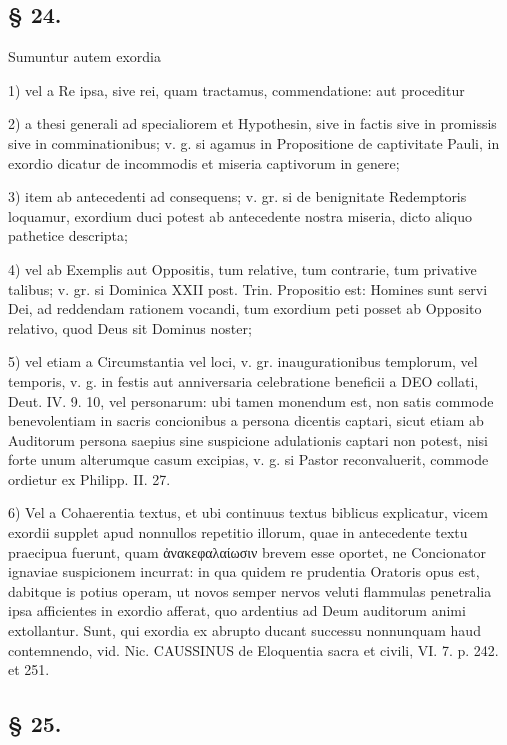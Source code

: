 \subsection*{§ 24.}

Sumuntur autem exordia

1) vel a Re ipsa, sive rei, quam tractamus, commendatione: aut proceditur

2) a thesi generali ad specialiorem et Hypothesin, sive in factis sive in promissis sive in comminationibus; v. g. si agamus in Propositione de captivitate Pauli, in exordio dicatur de incommodis et miseria captivorum in genere;

3) item ab antecedenti ad consequens; v. gr. si de benignitate Redemptoris loquamur, exordium duci potest ab antecedente nostra miseria, dicto aliquo pathetice descripta;

4) vel ab Exemplis aut Oppositis, tum relative, tum contrarie, tum privative talibus; v. gr. si Dominica XXII post. Trin. Propositio est: Homines sunt servi Dei, ad reddendam rationem vocandi, tum exordium peti posset ab Opposito relativo, quod Deus sit Dominus noster;

5) vel etiam a Circumstantia vel loci, v. gr. inaugurationibus templorum, vel temporis, v. g. in festis aut anniversaria celebratione beneficii a DEO collati, Deut. IV. 9. 10, vel personarum: ubi tamen monendum est, non satis commode benevolentiam in sacris concionibus a persona dicentis captari, sicut etiam ab Auditorum persona saepius sine suspicione adulationis captari non potest, nisi forte unum alterumque casum excipias, v. g. si Pastor reconvaluerit, commode ordietur ex Philipp. II. 27.

6) Vel a Cohaerentia textus, et ubi continuus textus biblicus explicatur, vicem exordii supplet apud nonnullos repetitio illorum, quae in antecedente textu praecipua fuerunt, quam ἀνακεφαλαίωσιν brevem esse oportet, ne Concionator ignaviae suspicionem incurrat: in qua quidem re prudentia Oratoris opus est, dabitque is potius operam, ut novos semper nervos veluti flammulas penetralia ipsa afficientes in exordio afferat, quo ardentius ad Deum auditorum animi extollantur. Sunt, qui exordia ex abrupto ducant successu nonnunquam haud contemnendo, vid. Nic. CAUSSINUS de Eloquentia sacra et civili, VI. 7. p. 242. et 251.

\subsection*{§ 25.}

